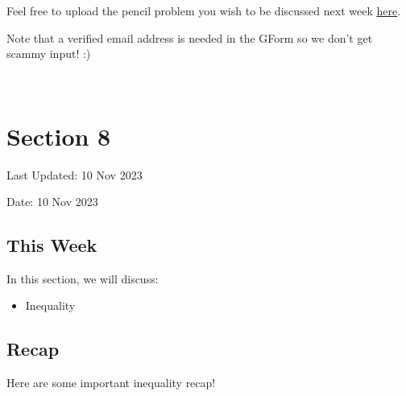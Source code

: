 \documentclass[
  letterpaper,
  DIV=11,
  numbers=noendperiod]{scrreprt}
\providecommand{\tightlist}{%
  \setlength{\itemsep}{0pt}\setlength{\parskip}{0pt}}\usepackage{longtable,booktabs,array}
\theoremstyle{definition}
\theoremstyle{plain}
\theoremstyle{remark}
\begin{document}
Feel free to upload the pencil problem you wish to be discussed next
week \href{https://forms.gle/RBmMNYJp4u3qD5W79}{here}.

Note that a verified email address is needed in the GForm so we don't
get scammy input! :)

\(\,\)


\hypertarget{section-8}{%
\chapter*{Section 8}\label{section-8}}


Last Updated: 10 Nov 2023

Date: 10 Nov 2023

\hypertarget{this-week}{%
\section*{This Week}\label{this-week}}


In this section, we will discuss:

\begin{itemize}
\tightlist
\item
  Inequality
\end{itemize}

\hypertarget{recap}{%
\section*{Recap}\label{recap}}


Here are some important inequality recap!
\end{document}
